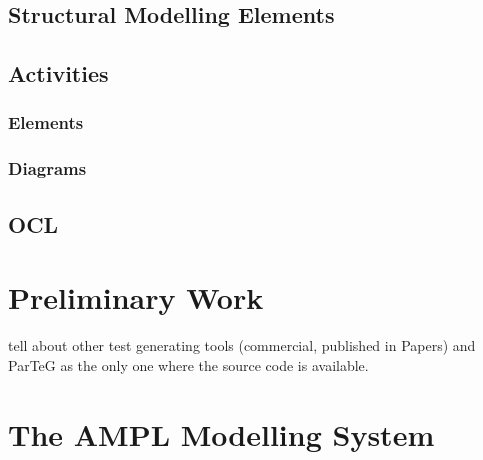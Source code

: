 \subsection{Structural Modelling Elements}
\subsection{Activities}
\subsubsection{Elements}
\subsubsection{Diagrams}
\subsection{OCL}

\section{Preliminary Work}
tell about other test generating tools (commercial, published in Papers) and ParTeG as the only one where the source code is available.\cite{ParTeG}

\section{The AMPL Modelling System}
\cite{AMPL}

